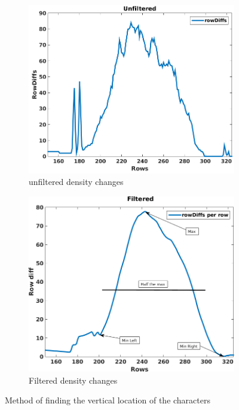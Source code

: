 \begin{figure}[ht]
  \centering
  \begin{subfigure}{0.49\textwidth}
    \centering
    \includegraphics[width=\textwidth]{./images/method/unfiltered.png}
    \caption{unfiltered density changes}
    \label{fig:method:unfiltered}
  \end{subfigure}
  \begin{subfigure}{0.49\textwidth}
    \centering
    \includegraphics[width=\textwidth]{./images/method/filtered.png}
    \caption{Filtered density changes}
    \label{fig:method:filtered}
  \end{subfigure}
  \caption{Method of finding the vertical location of the characters}
  \label{fig:method:vertical:location}
\end{figure}


